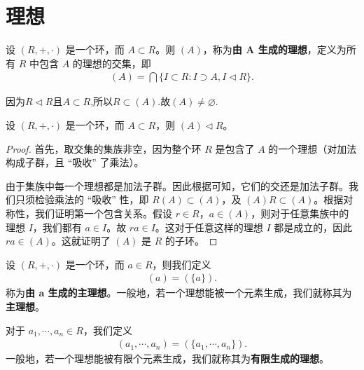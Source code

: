 \documentclass[../../main.tex]{subfiles}
\begin{document}
\section{理想}

\begin{definition}[由子集生成的理想]
设 $(R, +, \cdot)$ 是一个环，而 $A \subset R$。则 $(A)$，称为\textbf{由 $\boldsymbol{A}$ 生成的理想}，定义为所有 $R$ 中包含 $A$ 的理想的交集，即
\begin{align*}
(A) = \bigcap \{I \subset R : I \supset A, I \lhd R\}.
\end{align*} 
\end{definition}
\begin{note}
因为$R\lhd R$且$A\subset R$,所以$R\subset (A)$.故$(A)\ne \varnothing.$
\end{note}

\begin{proposition}[生成的理想还是理想]\label{proposition:由子集生成的理想还是理想}
设 $(R, +, \cdot)$ 是一个环，而 $A \subset R$，则 $(A) \lhd R$。
\end{proposition}
\begin{proof}
 首先，取交集的集族非空，因为整个环 $R$ 是包含了 $A$ 的一个理想（对加法构成子群，且 “吸收” 了乘法）。

由于集族中每一个理想都是加法子群。因此根据可知，它们的交还是加法子群。我们只须检验乘法的 “吸收” 性，即 $R(A) \subset (A)$，及 $(A)R \subset (A)$。根据对称性，我们证明第一个包含关系。假设 $r \in R$，$a \in (A)$，则对于任意集族中的理想 $I$，我们都有 $a \in I$。故 $ra \in I$。这对于任意这样的理想 $I$ 都是成立的，因此 $ra \in (A)$。这就证明了 $(A)$ 是 $R$ 的子环。 
\end{proof}

\begin{definition}
设 $(R, +, \cdot)$ 是一个环，而 $a \in R$，则我们定义
\begin{align*}
(a) = (\{a\}).
\end{align*}
称为\textbf{由 $\boldsymbol{a}$ 生成的主理想}。一般地，若一个理想能被一个元素生成，我们就称其为\textbf{主理想}。

对于 $a_1, \cdots, a_n \in R$，我们定义
\begin{align*}
(a_1, \cdots, a_n) = (\{a_1, \cdots, a_n\}).
\end{align*}
一般地，若一个理想能被有限个元素生成，我们就称其为\textbf{有限生成的理想}。 
\end{definition}
\end{document}
